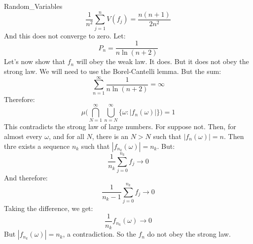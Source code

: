 \begin{lexample}{}{Random_Variables}
\begin{equation}
                    \frac{1}{n^{2}}\sum_{j=1}^{n}V(f_{j})=
                    \frac{n(n+1)}{2n^{2}}
                \end{equation}
                And this does not converge to zero. Let:
                \begin{equation}
                    P_{n}=\frac{1}{n\ln(n+2)}
                \end{equation}
                Let's now show that $f_{n}$ will obey the weak law.
                It does. But it does not obey the strong law. We will
                need to use the Borel-Cantelli lemma. But the sum:
                \begin{equation}
                    \sum_{n=1}^{\infty}\frac{1}{n\ln(n+2)}=\infty
                \end{equation}
                Therefore:
                \begin{equation}
                    \mu\Big(\bigcap_{N=1}^{\infty}\bigcup_{n=N}^{\infty}
                        \{\omega:|f_{n}(\omega)|\}\Big)=1
                \end{equation}
                This contradicts the strong law of large numbers. For
                suppose not. Then, for almost every $\omega$, and for
                all $N$, there is an $N>N$ such that
                $|f_{n}(\omega)|=n$. Then thre exists a sequence
                $n_{k}$ such that $|f_{n_{k}}(\omega)|=n_{k}$.
                But:
                \begin{equation}
                    \frac{1}{n_{k}}\sum_{j=0}^{n_{k}}f_{j}\rightarrow{0}
                \end{equation}
                And therefore:
                \begin{equation}
                    \frac{1}{n_{k}-1}\sum_{j=0}^{n_{k}}f_{j}
                        \rightarrow{0}
                \end{equation}
                Taking the difference, we get:
                \begin{equation}
                    \frac{1}{n_{k}}f_{n_{k}}(\omega)\rightarrow{0}
                \end{equation}
                But $|f_{n_{k}}(\omega)|=n_{k}$, a contradiction.
                So the $f_{n}$ do not obey the strong law.
            \end{lexample}
